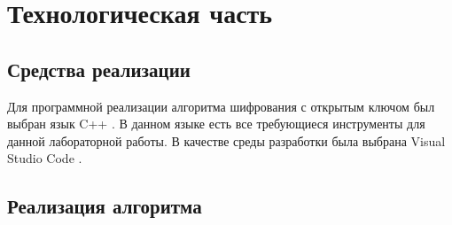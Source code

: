 \chapter{Технологическая часть}




\section{Средства реализации}

Для программной реализации алгоритма шифрования с открытым ключом был выбран язык C++ \cite{cpp}.
В данном языке есть все требующиеся инструменты для данной лабораторной работы.
В качестве среды разработки была выбрана Visual Studio Code \cite{vscode}.




\section{Реализация алгоритма}

